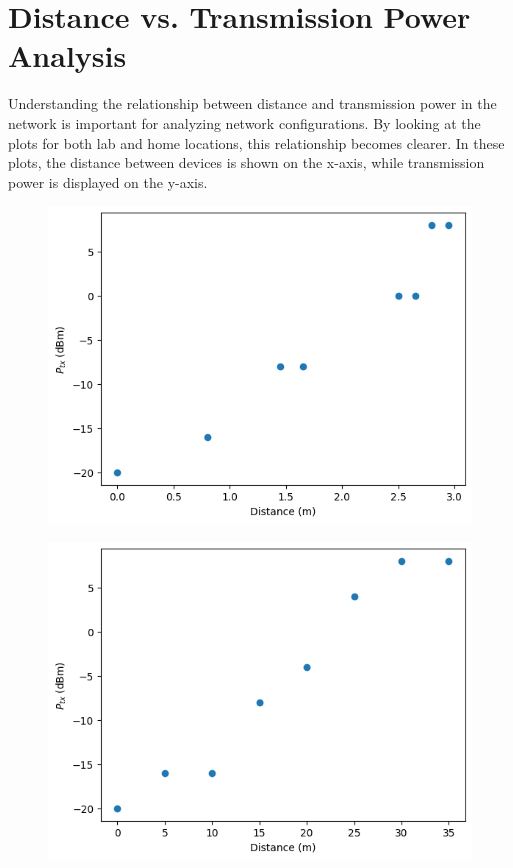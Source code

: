 \section{Distance vs. Transmission Power Analysis}

Understanding the relationship between distance and transmission power in the network is important for analyzing network configurations. By looking at the plots for both lab and home locations, this relationship becomes clearer. In these plots, the distance between devices is shown on the x-axis, while transmission power is displayed on the y-axis.

\begin{figure}[H]
  \centering
  \begin{minipage}[t]{0.5\textwidth}
      \centering
      \includegraphics[width=1\linewidth]{images/research_results/distance-vs-transmission-power/mcm/lab-distance-vs-txpower.png}
      \label{fig:lab_distance_vs_txpower_mcm}
  \end{minipage}\hfill
  \begin{minipage}[t]{0.5\textwidth}
      \centering
      \includegraphics[width=1\linewidth]{images/research_results/distance-vs-transmission-power/mcm/home-distance-vs-txpower.png}

\end{minipage}
\end{figure}
